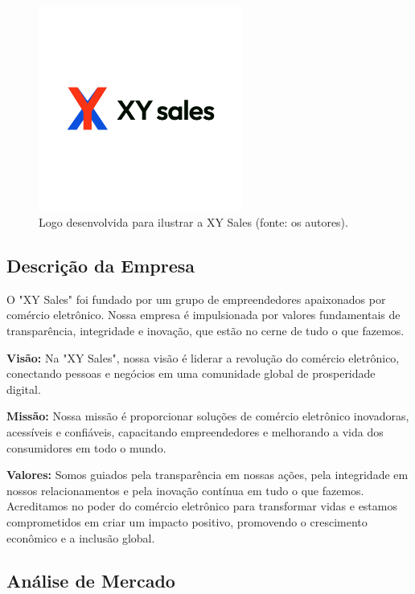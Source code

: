 \documentclass[
	12pt,				%
	openright,			%
	twoside,			%
	a4paper,			%
	english,			%
	brazil				%
	]{abntex2}
\begin{document}
\begin{figure}[htb]
	\centering
	\includegraphics[width=0.6\textwidth]{img/XY-logo}
	\caption{Logo desenvolvida para ilustrar a XY Sales (fonte: os autores).}
	\label{fig:logo-geekstore}
\end{figure}

\subsection{Descrição da Empresa}

O "XY Sales" foi fundado por um grupo de empreendedores apaixonados por comércio eletrônico. Nossa empresa é impulsionada por valores fundamentais de transparência, integridade e inovação, que estão no cerne de tudo o que fazemos.

\textbf{Visão:} Na "XY Sales", nossa visão é liderar a revolução do comércio eletrônico, conectando pessoas e negócios em uma comunidade global de prosperidade digital.

\textbf{Missão:} Nossa missão é proporcionar soluções de comércio eletrônico inovadoras, acessíveis e confiáveis, capacitando empreendedores e melhorando a vida dos consumidores em todo o mundo.

\textbf{Valores:} Somos guiados pela transparência em nossas ações, pela integridade em nossos relacionamentos e pela inovação contínua em tudo o que fazemos. Acreditamos no poder do comércio eletrônico para transformar vidas e estamos comprometidos em criar um impacto positivo, promovendo o crescimento econômico e a inclusão global.


\subsection{Análise de Mercado}
\end{document}
